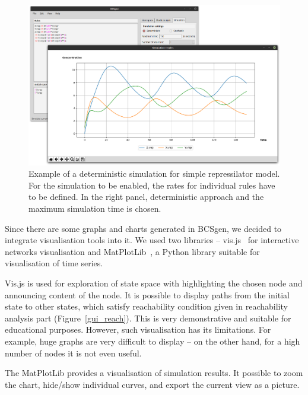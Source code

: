 \documentclass[12pt, twoside]{fithesis2} %
\begin{document}
\begin{figure}[!h]
\begin{center}
\includegraphics[scale=0.23]{pics/BCSgen_simulation}
\caption{Example of a deterministic simulation for simple repressilator model. For the simulation to be enabled, the rates for individual rules have to be defined. In the right panel, deterministic approach and the maximum simulation time is chosen.}\label{gui_simulation}
\end{center}
\end{figure}

Since there are some graphs and charts generated in BCSgen, we decided to integrate visualisation tools into it. We used two libraries -- vis.js~\cite{almende2016vis} for interactive networks visualisation and MatPlotLib~\cite{hunter2007matplotlib}, a Python library suitable for visualisation of time series.

Vis.js is used for exploration of state space with highlighting the chosen node and announcing content of the node. It is possible to display paths from the initial state to other states, which satisfy reachability condition given in reachability analysis part (Figure~\ref{gui_reach}). This is very demonstrative and suitable for educational purposes. However, such visualisation has its limitations. For example, huge graphs are very difficult to display -- on the other hand, for a high number of nodes it is not even useful.

The MatPlotLib provides a visualisation of simulation results. It possible to zoom the chart, hide/show individual curves, and export the current view as a picture.
\end{document}
